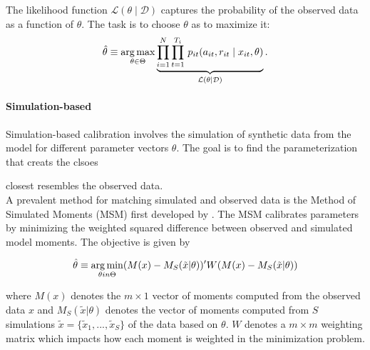 \noindent The likelihood function $\mathcal{L}(\theta\mid\mathcal{D})$ captures the probability of the observed data as a function of $\theta$. The task is to choose $\theta$ as to maximize it:
%
\begin{align*}
  \hat{\theta} \equiv \operatorname*{arg\,max}_{\theta \in \Theta}  \underbrace{\prod^N_{i= 1} \prod^{T_i}_{t= 1}\, p_{it}(a_{it}, r_{it} \mid x_{it}, \theta)}_{\mathcal{L}(\theta\mid\mathcal{D})}.
\end{align*}

\paragraph{Simulation-based} Simulation-based calibration involves the simulation of synthetic data from the model for different parameter vectors $\theta$. The goal is to find the parameterization that creats the clsoes

closest resembles the observed data.\\

\noindent A prevalent method for matching simulated and observed data is the Method of Simulated Moments (MSM) first developed by \citet{McFadden.1989}. The MSM calibrates parameters by minimizing the weighted squared difference between observed and simulated model moments. The objective is given by

\begin{align*}
	\hat{\theta} \equiv \operatorname*{arg\,min}_{\theta in \Theta} (M(x) - M_S(\tilde{x}| \theta))' W (M(x) - M_S(\tilde{x}|\theta))
\end{align*}

where $M(x)$ denotes the $m \times 1$ vector of moments computed from the observed data $x$
and $M_S(\tilde{x}| \theta)$ denotes the vector of moments computed from $S$ simulations $\tilde{x} = \{\tilde{x}_1, ... , \tilde{x}_S\}$ of the data based on $\theta$. $W$ denotes a $m \times m$ weighting matrix which impacts how each moment is weighted in the minimization problem.
